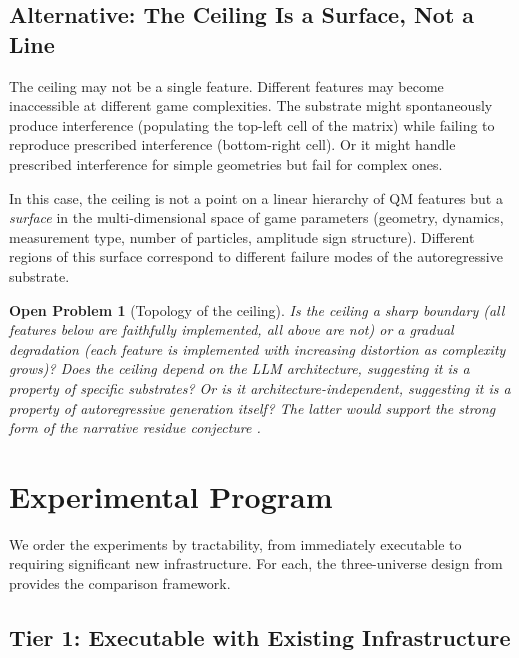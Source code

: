 \documentclass[12pt,a4paper]{article}
\newtheorem{openproblem}[theorem]{Open Problem}
\theoremstyle{definition}
\theoremstyle{remark}
\begin{document}
\subsection{Alternative: The Ceiling Is a Surface, Not a Line}
\label{sec:surface}

The ceiling may not be a single feature.  Different features may become inaccessible at different game complexities.  The substrate might spontaneously produce interference (populating the top-left cell of the matrix) while failing to reproduce prescribed interference (bottom-right cell).  Or it might handle prescribed interference for simple geometries but fail for complex ones.

In this case, the ceiling is not a point on a linear hierarchy of QM features but a \emph{surface} in the multi-dimensional space of game parameters (geometry, dynamics, measurement type, number of particles, amplitude sign structure).  Different regions of this surface correspond to different failure modes of the autoregressive substrate.

\begin{openproblem}[Topology of the ceiling]
\label{op:topology}
Is the ceiling a sharp boundary (all features below are faithfully implemented, all above are not) or a gradual degradation (each feature is implemented with increasing distortion as complexity grows)?  Does the ceiling depend on the LLM architecture, suggesting it is a property of specific substrates?  Or is it architecture-independent, suggesting it is a property of autoregressive generation itself?  The latter would support the strong form of the narrative residue conjecture \citep{Baldo2026Residue}.
\end{openproblem}


\section{Experimental Program}
\label{sec:experimental}

We order the experiments by tractability, from immediately executable to requiring significant new infrastructure.  For each, the three-universe design from \citet{Baldo2026Rosencrantz} provides the comparison framework.

\subsection{Tier 1: Executable with Existing Infrastructure}
\end{document}
